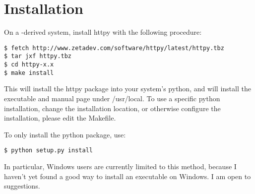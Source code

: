 \chapter{Installation}

On a \UNIX-derived system, install httpy with the following procedure:

\begin{verbatim}
$ fetch http://www.zetadev.com/software/httpy/latest/httpy.tbz
$ tar jxf httpy.tbz
$ cd httpy-x.x
$ make install
\end{verbatim}

This will install the httpy package into your system's python, and will install
the executable and manual page under /usr/local. To use a specific python
installation, change the installation location, or otherwise configure the
installation, please edit the Makefile.

To only install the python package, use:

\begin{verbatim}
$ python setup.py install
\end{verbatim}

In particular, Windows users are currently limited to this method, because I
haven't yet found a good way to install an executable on Windows. I am open to
suggestions.
